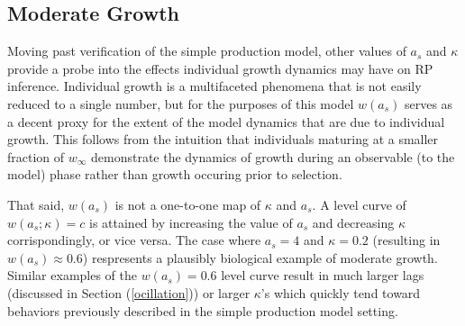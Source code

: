 %
\subsection{Moderate Growth}

%
Moving past verification of the simple production model, other values of $a_s$ 
and $\kappa$ provide a probe into the effects individual growth dynamics may 
have on RP inference. 
%
Individual growth is a multifaceted phenomena that is not easily reduced 
to a single number, but for the purposes of this model $w(a_s)$ serves as a decent 
proxy for the extent of the model dynamics that are due to individual growth. %
%
This follows from the intuition that individuals maturing at a smaller fraction 
of $w_\infty$ demonstrate the dynamics of growth during an observable (to the model) %
phase rather than growth occuring prior to selection. %

%
That said, $w(a_s)$ is not a one-to-one map of $\kappa$ and $a_s$.
%
A level curve of $w(a_s; \kappa)=c$ is attained by increasing the value of $a_s$ 
and decreasing $\kappa$ corrispondingly, or vice versa.
%
The case where $a_s=4$ and $\kappa=0.2$ (resulting in $w(a_s)\approx0.6$) 
respresents a plausibly biological example of moderate growth. 
%
Similar examples of the $w(a_s)=0.6$ level curve result in much larger lags 
(discussed in Section (\ref{ocillation})) or larger $\kappa$'s which quickly 
tend toward behaviors previously described in the simple production model 
setting.

